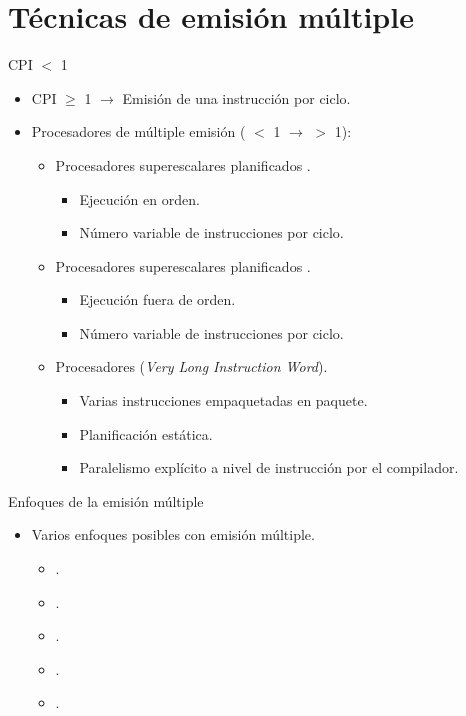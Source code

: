 \section{Técnicas de emisión múltiple}

\begin{frame}[t]{CPI $<$ 1}
\begin{itemize}
  \item CPI $\geq$ 1 $\rightarrow$ Emisión de una instrucción por ciclo.

  \item Procesadores de múltiple emisión 
        ( $<$ 1 $\rightarrow$  $>$ 1):
    \begin{itemize}
      \item Procesadores superescalares planificados .
        \begin{itemize}
          \item Ejecución en orden.
          \item Número variable de instrucciones por ciclo.
        \end{itemize}
      \item Procesadores superescalares planificados .
        \begin{itemize}
          \item Ejecución fuera de orden.
          \item Número variable de instrucciones por ciclo.
        \end{itemize}
      \item Procesadores  (\emph{Very Long Instruction Word}).
        \begin{itemize}
          \item Varias instrucciones empaquetadas en paquete.
          \item Planificación estática.
          \item Paralelismo explícito a nivel de instrucción por el compilador.
        \end{itemize}
    \end{itemize}
\end{itemize}
\end{frame}

\begin{frame}[t]{Enfoques de la emisión múltiple}
\begin{itemize}
  \item Varios enfoques posibles con emisión múltiple.
    \begin{itemize}
      \item {}.
      \item {}.
      \item {}.
      \item {}.
      \item {}.
    \end{itemize}
\end{itemize}
\end{frame}

